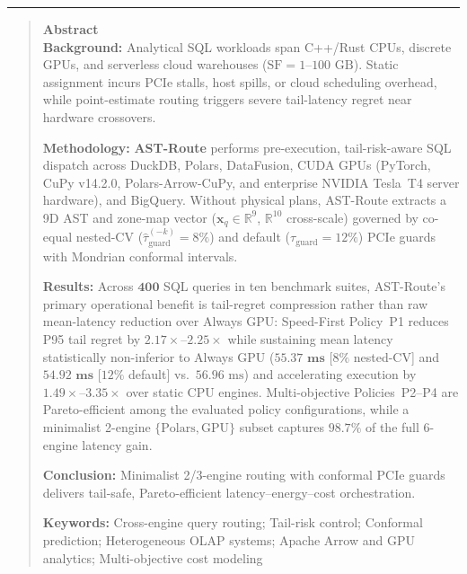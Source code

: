 \documentclass[10pt,a4paper]{article}
\begin{document}
\noindent\rule{\textwidth}{0.8pt}
\begin{quote}
\small\sffamily
\textbf{\color{springerblue}Abstract}\\[0.3em]
\textbf{Background:} Analytical SQL workloads span C++/Rust CPUs, discrete GPUs, and serverless cloud warehouses ($\text{SF}=1\text{--}100\text{ GB}$). Static assignment incurs PCIe stalls, host spills, or cloud scheduling overhead, while point-estimate routing triggers severe tail-latency regret near hardware crossovers.

\textbf{Methodology:} \textbf{AST-Route} performs pre-execution, tail-risk-aware SQL dispatch across DuckDB, Polars, DataFusion, CUDA GPUs (PyTorch, CuPy v14.2.0, Polars-Arrow-CuPy, and enterprise NVIDIA Tesla~T4 server hardware), and BigQuery. Without physical plans, AST-Route extracts a 9D AST and zone-map vector ($\mathbf{x}_q \in \mathbb{R}^{9}$, $\mathbb{R}^{10}$ cross-scale) governed by co-equal nested-CV ($\hat{\tau}_{\text{guard}}^{(-k)}=8\%$) and default ($\tau_{\text{guard}}=12\%$) PCIe guards with Mondrian conformal intervals.

\textbf{Results:} Across $\mathbf{400}$ SQL queries in ten benchmark suites, AST-Route's primary operational benefit is tail-regret compression rather than raw mean-latency reduction over Always GPU: Speed-First Policy~P1 reduces P95 tail regret by $\mathbf{2.17\times\text{--}2.25\times}$ while sustaining mean latency statistically non-inferior to Always GPU ($\mathbf{55.37\text{ ms}}$ [$8\%$ nested-CV] and $\mathbf{54.92\text{ ms}}$ [$12\%$ default] vs.\ $56.96\text{ ms}$) and accelerating execution by $\mathbf{1.49\times\text{--}3.35\times}$ over static CPU engines. Multi-objective Policies~P2--P4 are Pareto-efficient among the evaluated policy configurations, while a minimalist 2-engine $\{\text{Polars}, \text{GPU}\}$ subset captures $\mathbf{98.7\%}$ of the full 6-engine latency gain.

\textbf{Conclusion:} Minimalist 2/3-engine routing with conformal PCIe guards delivers tail-safe, Pareto-efficient latency--energy--cost orchestration.

\noindent\textbf{Keywords:} Cross-engine query routing; Tail-risk control; Conformal prediction; Heterogeneous OLAP systems; Apache Arrow and GPU analytics; Multi-objective cost modeling
\end{quote}
\end{document}
